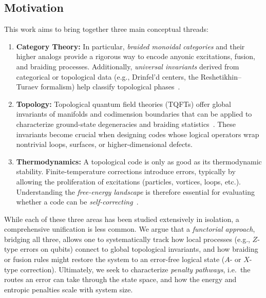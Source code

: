 \documentclass[12pt]{article}
\begin{document}
\subsection{Motivation}
This work aims to bring together three main conceptual threads:
\begin{enumerate}
    \item \textbf{Category Theory:} In particular, \emph{braided monoidal categories} and their higher analogs provide a rigorous way to encode anyonic excitations, fusion, and braiding processes. Additionally, \emph{universal invariants} derived from categorical or topological data (e.g., Drinfel’d centers, the Reshetikhin–Turaev formalism) help classify topological phases~\cite{kassel2008quantum, turaev2010hqft}.
    \item \textbf{Topology:} Topological quantum field theories (TQFTs) offer global invariants of manifolds and codimension boundaries that can be applied to characterize ground-state degeneracies and braiding statistics~\cite{atiyah1988topological, freed2019lectures}. These invariants become crucial when designing codes whose logical operators wrap nontrivial loops, surfaces, or higher-dimensional defects.
    \item \textbf{Thermodynamics:} A topological code is only as good as its thermodynamic stability. Finite-temperature corrections introduce errors, typically by allowing the proliferation of excitations (particles, vortices, loops, etc.). Understanding the \emph{free-energy landscape} is therefore essential for evaluating whether a code can be \emph{self-correcting}~\cite{nussinov2008autocorrelations, chesi2010self}.
\end{enumerate}

While each of these three areas has been studied extensively in isolation, a comprehensive unification is less common. We argue that a \emph{functorial approach}, bridging all three, allows one to systematically track how local processes (e.g., $Z$-type errors on qubits) connect to global topological invariants, and how braiding or fusion rules might restore the system to an error-free logical state ($A$- or $X$-type correction). Ultimately, we seek to characterize \emph{penalty pathways}, i.e.\ the routes an error can take through the state space, and how the energy and entropic penalties scale with system size.
\end{document}
